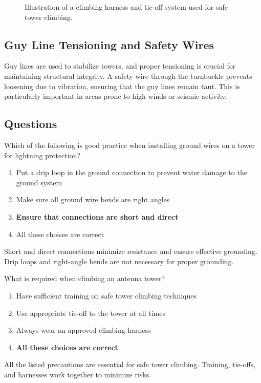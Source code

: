 \begin{figure}[h]
    \centering
    \caption{Illustration of a climbing harness and tie-off system used for safe tower climbing.}
    \label{fig:climbing_harness}
\end{figure}

\subsection*{Guy Line Tensioning and Safety Wires}
Guy lines are used to stabilize towers, and proper tensioning is crucial for maintaining structural integrity. A safety wire through the turnbuckle prevents loosening due to vibration, ensuring that the guy lines remain taut. This is particularly important in areas prone to high winds or seismic activity.

\subsection*{Questions}

\begin{tcolorbox}[colback=gray!10!white,colframe=black!75!black,title={T0B01}]
Which of the following is good practice when installing ground wires on a tower for lightning protection?
\begin{enumerate}[label=\Alph*,noitemsep]
    \item Put a drip loop in the ground connection to prevent water damage to the ground system
    \item Make sure all ground wire bends are right angles
    \item \textbf{Ensure that connections are short and direct}
    \item All these choices are correct
\end{enumerate}
\end{tcolorbox}
Short and direct connections minimize resistance and ensure effective grounding. Drip loops and right-angle bends are not necessary for proper grounding.


\begin{tcolorbox}[colback=gray!10!white,colframe=black!75!black,title={T0B02}]
What is required when climbing an antenna tower?
\begin{enumerate}[label=\Alph*,noitemsep]
    \item Have sufficient training on safe tower climbing techniques
    \item Use appropriate tie-off to the tower at all times
    \item Always wear an approved climbing harness
    \item \textbf{All these choices are correct}
\end{enumerate}
\end{tcolorbox}
All the listed precautions are essential for safe tower climbing. Training, tie-offs, and harnesses work together to minimize risks.


